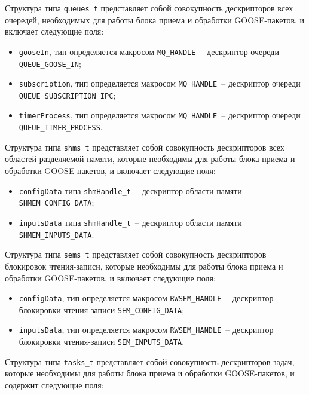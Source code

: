 Структура типа \lstinline{queues_t} представляет собой совокупность дескрипторов всех очередей, необходимых для работы блока приема и обработки GOOSE-пакетов, и включает следующие поля:

\begin{itemize}
    \item \lstinline{gooseIn}, тип определяется макросом \lstinline{MQ_HANDLE}~-- дескриптор очереди \lstinline{QUEUE_GOOSE_IN};
    \item \lstinline{subscription}, тип определяется макросом \lstinline{MQ_HANDLE}~-- дескриптор очереди \lstinline{QUEUE_SUBSCRIPTION_IPC};
    \item \lstinline{timerProcess}, тип определяется макросом \lstinline{MQ_HANDLE}~-- дескриптор очереди \lstinline{QUEUE_TIMER_PROCESS}.
\end{itemize}

Структура типа \lstinline{shms_t} представляет собой совокупность дескрипторов всех областей разделяемой памяти, которые необходимы для работы блока приема и обработки GOOSE-пакетов, и включает следующие поля:

\begin{itemize}
    \item \lstinline{configData} типа \lstinline{shmHandle_t}~-- дескриптор области памяти \lstinline{SHMEM_CONFIG_DATA};
    \item \lstinline{inputsData} типа \lstinline{shmHandle_t}~-- дескриптор области памяти \lstinline{SHMEM_INPUTS_DATA}.
\end{itemize}

Структура типа \lstinline{sems_t} представляет собой совокупность дескрипторов блокировок чтения-записи, которые необходимы для работы блока приема и обработки GOOSE-пакетов, и включает следующие поля:

\begin{itemize}
    \item \lstinline{configData}, тип определяется макросом \lstinline{RWSEM_HANDLE}~-- дескриптор блокировки чтения-записи \lstinline{SEM_CONFIG_DATA};
    \item \lstinline{inputsData}, тип определяется макросом \lstinline{RWSEM_HANDLE}~-- дескриптор блокировки чтения-записи \lstinline{SEM_INPUTS_DATA}.
\end{itemize}

Структура типа \lstinline{tasks_t} представляет собой совокупность дескрипторов задач, которые необходимы для работы блока приема и обработки GOOSE-пакетов, и содержит следующие поля:

